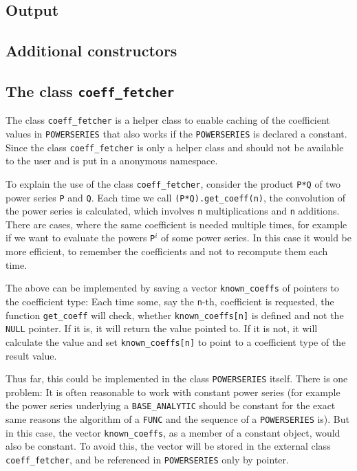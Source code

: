 \documentclass{article}
\newcommand{\code}[1]{\texttt{#1}}
\newcommand{\func}[1]{\texttt{#1}}
\newcommand{\NULL}{\texttt{NULL} pointer\xspace}
\begin{document}
\subsection{Output}

\subsection{Additional constructors}

\subsection{The class \code{coeff\_fetcher}}

The class \code{coeff\_fetcher} is a helper class to enable caching of the coefficient values in \func{POWERSERIES} that also works if the \func{POWERSERIES} is declared a constant. Since the class \code{coeff\_fetcher} is only a helper class and should not be available to the user and is put in a anonymous namespace.

To explain the use of the class \code{coeff\_fetcher}, consider the product \code{P*Q} of two power series \code{P} and \code{Q}. Each time we call \code{(P*Q).get\_coeff(n)}, the convolution of the power series is calculated, which involves \code{n} multiplications and \code{n} additions. There are cases, where the same coefficient is needed multiple times, for example if we want to evaluate the powers \code{P}$^i$ of some power series. In this case it would be more efficient, to remember the coefficients and not to recompute them each time.

The above can be implemented by saving a vector \code{known\_coeffs} of pointers to the coefficient type: Each time some, say the \code{n}-th, coefficient is requested, the function \code{get\_coeff} will check, whether \code{known\_coeffs[n]} is defined and not the \NULL. If it is, it will return the value pointed to. If it is not, it will calculate the value and set \code{known\_coeffs[n]} to point to a coefficient type of the result value.

Thus far, this could be implemented in the class \func{POWERSERIES} itself. There is one problem: It is often reasonable to work with constant power series (for example the power series underlying a \func{BASE\_ANALYTIC} should be constant for the exact same reasons the algorithm of a \func{FUNC} and the sequence of a \func{POWERSERIES} is). But in this case, the vector \code{known\_coeffs}, as a member of a constant object, would also be constant. To avoid this, the vector will be stored in the external class \func{coeff\_fetcher}, and be referenced in \func{POWERSERIES} only by pointer.
\end{document}
